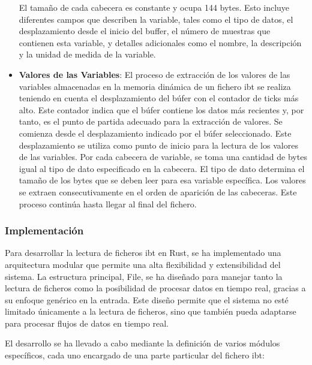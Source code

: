 \begin{itemize}
    El tamaño de cada cabecera es constante y ocupa 144 bytes. Esto incluye diferentes campos que describen la variable, tales como el tipo de datos, el desplazamiento desde el inicio del buffer, el número de muestras que contienen esta variable, y detalles adicionales como el nombre, la descripción y la unidad de medida de la variable.

    \item \textbf{Valores de las Variables}: El proceso de extracción de los valores de las variables almacenadas en la memoria dinámica de un fichero \ac{ibt} se realiza teniendo en cuenta el desplazamiento del búfer con el contador de ticks más alto. Este contador indica que el búfer contiene los datos más recientes y, por tanto, es el punto de partida adecuado para la extracción de valores. Se comienza desde el desplazamiento indicado por el búfer seleccionado. Este desplazamiento se utiliza como punto de inicio para la lectura de los valores de las variables. Por cada cabecera de variable, se toma una cantidad de bytes igual al tipo de dato especificado en la cabecera. El tipo de dato determina el tamaño de los bytes que se deben leer para esa variable específica. Los valores se extraen consecutivamente en el orden de aparición de las cabeceras. Este proceso continúa hasta llegar al final del fichero.
\end{itemize}

\subsubsection*{Implementación}

Para desarrollar la lectura de ficheros \ac{ibt} en Rust, se ha implementado una arquitectura modular que permite una alta flexibilidad y extensibilidad del sistema. La estructura principal, File, se ha diseñado para manejar tanto la lectura de ficheros como la posibilidad de procesar datos en tiempo real, gracias a su enfoque genérico en la entrada. Este diseño permite que el sistema no esté limitado únicamente a la lectura de ficheros, sino que también pueda adaptarse para procesar flujos de datos en tiempo real.

El desarrollo se ha llevado a cabo mediante la definición de varios módulos específicos, cada uno encargado de una parte particular del fichero \ac{ibt}:

